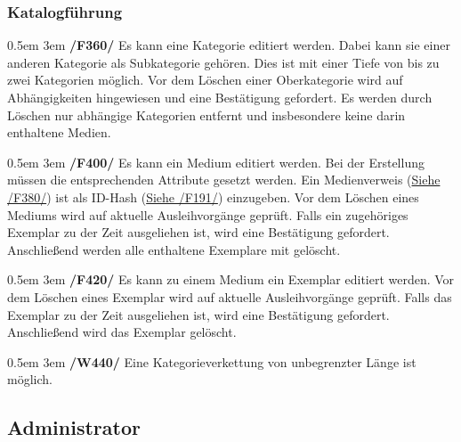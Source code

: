\documentclass{article}
\newcommand{\specification}[3]{
	{\parindent 0.5em \hangindent 3em \hypertarget{spec:#1:#2}{\textbf{/#1#2/}} #3 \par \nobreak \vspace*{0.5em}}
}
\begin{document}
	\subsubsection{Katalogführung}
		\specification{F}{360}{Es kann eine Kategorie editiert werden. Dabei kann sie einer anderen Kategorie als Subkategorie gehören. Dies ist mit einer Tiefe von bis zu zwei Kategorien möglich.
			Vor dem Löschen einer Oberkategorie wird auf Abhängigkeiten hingewiesen und eine Bestätigung gefordert.
			Es werden durch Löschen nur abhängige Kategorien entfernt und insbesondere keine darin enthaltene Medien. }
		\specification{F}{400}{Es kann ein Medium editiert werden. Bei der Erstellung müssen die entsprechenden Attribute gesetzt werden.
			Ein Medienverweis (\hyperlink{spec:F:380}{Siehe /F380/}) ist als ID-Hash (\hyperlink{spec:F:191}{Siehe /F191/}) einzugeben.
			Vor dem Löschen eines Mediums wird auf aktuelle Ausleihvorgänge geprüft. Falls ein zugehöriges Exemplar zu der Zeit ausgeliehen ist, wird eine Bestätigung gefordert.
			Anschließend werden alle enthaltene Exemplare mit gelöscht. }
		\specification{F}{420}{Es kann zu einem Medium ein Exemplar editiert werden. Vor dem Löschen eines Exemplar wird auf aktuelle Ausleihvorgänge geprüft.
			Falls das Exemplar zu der Zeit ausgeliehen ist, wird eine Bestätigung gefordert. Anschließend wird das Exemplar gelöscht. }
		\specification{W}{440}{Eine Kategorieverkettung von unbegrenzter Länge ist möglich. }
\subsection{Administrator}
\end{document}
